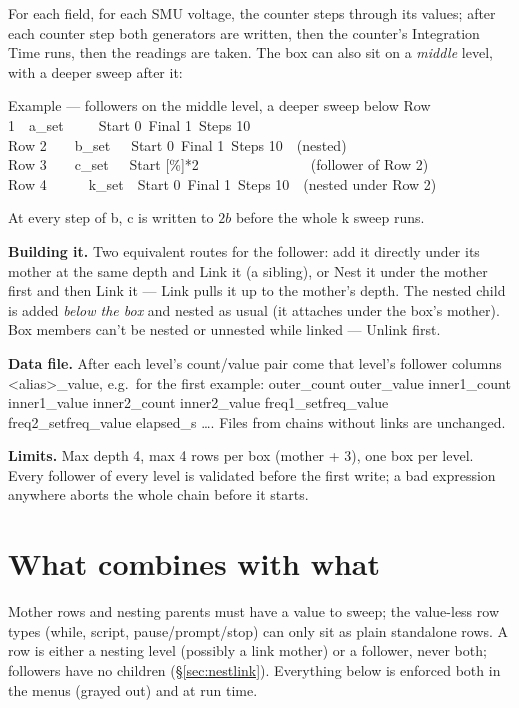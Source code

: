 \documentclass[11pt,a4paper]{article}
\newcommand{\code}[1]{{\ttfamily\color{qcode}#1}}
\begin{document}
\noindent For each field, for each SMU voltage, the counter steps through
its values; after each counter step both generators are written, then the
counter's Integration Time runs, then the readings are taken. The box can
also sit on a \emph{middle} level, with a deeper sweep after it:

\begin{gridex}{Example --- followers on the middle level, a deeper sweep below}
Row 1\ \ a\_set\ \ \ \ \ Start 0\ Final 1\ Steps 10\\
Row 2\ \ \ \ b\_set\ \ \ Start 0\ Final 1\ Steps 10\ \ (nested)\\
Row 3\ \ \ \ c\_set\ \ \ Start [\%]*2\ \ \ \ \ \ \ \ \ \ \ \ \ \ \ \ (follower of Row 2)\\
Row 4\ \ \ \ \ \ k\_set\ \ Start 0\ Final 1\ Steps 10\ \ (nested under Row 2)
\end{gridex}

\noindent At every step of \code{b}, \code{c} is written to $2b$ before the
whole \code{k} sweep runs.

\textbf{Building it.} Two equivalent routes for the follower: add it directly
under its mother at the same depth and Link it (a sibling), or Nest it under
the mother first and then Link it --- Link pulls it up to the mother's depth.
The nested child is added \emph{below the box} and nested as usual (it
attaches under the box's mother). Box members can't be nested or unnested
while linked --- Unlink first.

\textbf{Data file.} After each level's \code{count}/\code{value} pair come
that level's follower columns \code{<alias>\_value}, e.g.\ for the first
example: \code{outer\_count outer\_value inner1\_count inner1\_value
inner2\_count inner2\_value freq1\_setfreq\_value freq2\_setfreq\_value
elapsed\_s \ldots}. Files from chains without links are unchanged.

\textbf{Limits.} Max depth 4, max 4 rows per box (mother + 3), one box per
level. Every follower of every level is validated before the first write; a
bad expression anywhere aborts the whole chain before it starts.

\section{What combines with what}

Mother rows and nesting parents must have a value to sweep; the
value-less row types (while, script, pause/prompt/stop) can only sit as
plain standalone rows. A row is either a nesting level (possibly a link
mother) or a follower, never both; followers have no children
(\S\ref{sec:nestlink}). Everything below is enforced both in the menus
(grayed out) and at run time.
\end{document}
